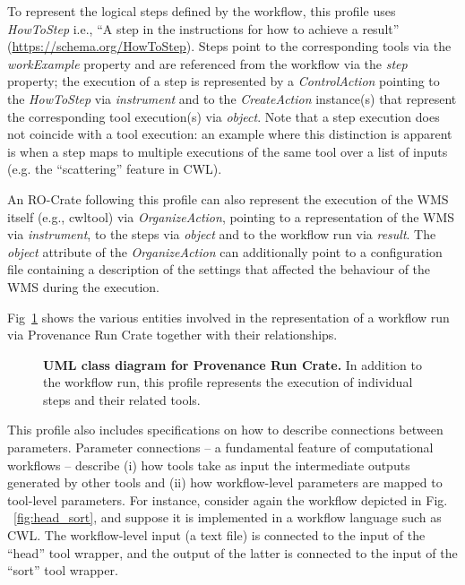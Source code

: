 \documentclass[10pt,letterpaper]{article}
\begin{document}
To represent the logical steps defined by the workflow, this profile uses \emph{HowToStep} i.e., “A step in the instructions for how to achieve a result” (\url{https://schema.org/HowToStep}).
Steps point to the corresponding tools via the \emph{workExample} property and are referenced from the workflow via the \emph{step} property; the execution of a step is represented by a \emph{ControlAction} pointing to the
\emph{HowToStep} via \emph{instrument} and to the \emph{CreateAction}
instance(s) that represent the corresponding tool execution(s) via
\emph{object}.
Note that a step execution does not coincide with a tool execution: an example where this distinction is apparent is when a step maps to multiple executions of the same tool over a list of inputs (e.g. the ``scattering'' feature in CWL).

An RO-Crate following this profile can also represent the execution of the WMS itself (e.g., cwltool) via
\emph{OrganizeAction}, pointing to a representation of the WMS via
\emph{instrument}, to the steps via \emph{object} and to the workflow run via \emph{result}.
The \emph{object} attribute of the
\emph{OrganizeAction} can additionally point to a configuration file containing a description of the settings that affected the behaviour of the WMS during the execution.

Fig~\ref{fig:provenance_crate_er} shows the various entities involved in the representation of a workflow run via Provenance Run Crate together with their relationships.

\begin{figure}[!h]
\caption{{\bf UML class diagram for Provenance Run Crate.}
In addition to the workflow run, this profile represents the execution of individual steps and their related tools.}
\label{fig:provenance_crate_er}
\end{figure}

This profile also includes specifications on how to describe connections between parameters.
Parameter connections -- a fundamental feature of computational workflows -- describe (i) how tools take as input the intermediate outputs generated by other tools and (ii) how workflow-level parameters are mapped to tool-level parameters.
For instance, consider again the workflow depicted in Fig. ~\ref{fig:head_sort},
and suppose it is implemented in a workflow language such as CWL. The workflow-level input (a text file) is connected to the input of the “head” tool wrapper, and the output of the latter is connected to the input of the “sort” tool wrapper.
\end{document}
